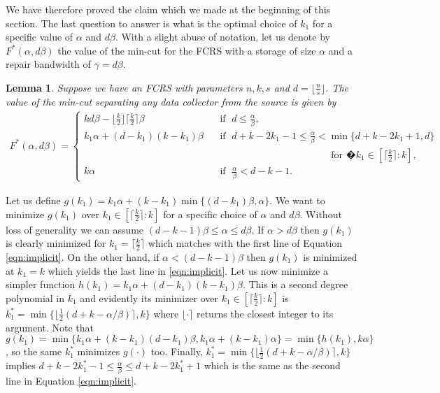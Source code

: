 \documentclass[journal,onecolumn,draftcls]{IEEEtran}
\newtheorem{lemma}{Lemma}
\begin{document}
We have therefore proved the claim which we made at the beginning of this section. The last question to answer is what is the optimal choice of $k_1$ for a specific value of $\alpha$ and $d\beta$. With a slight abuse of notation, let us denote by $F^*(\alpha,d\beta)$ the value of the min-cut for the FCRS with a storage of size $\alpha$ and a repair bandwidth of $\gamma = d\beta$.
\begin{lemma} Suppose we have an FCRS with parameters $n,k,s$ and $d = \lfloor\frac{n}{s}\rfloor$. The value of the min-cut separating any data collector from the source is given by 
\begin{eqnarray}
F^*(\alpha,d\beta) =
\begin{cases}
kd\beta - \lfloor\frac{k}{2}\rfloor\lceil\frac{k}{2}\rceil\beta &\;\;\mbox{ if } \;d\le \frac{\alpha}{\beta},\\
 k_1\alpha + (d-k_1)(k-k_1)\beta&\;\;\mbox{ if } \;d + k - 2k_1 - 1 \le \frac{\alpha}{\beta}<  \min\{d + k - 2k_1 +1,d\} \; \\& \hspace{5cm}\mbox{ for }�k_1 \in[\lceil\frac{k}{2}\rceil : k],\\
 k\alpha &\;\;\mbox{ if } \;\frac{\alpha}{\beta} < d- k - 1.
\end{cases}
\label{eqn:implicit}
\end{eqnarray}
\label{lemma:optimal}
\end{lemma}
\begin{IEEEproof}
Let us define $g(k_1) = k_1\alpha + (k-k_1)\min\{(d-k_1)\beta,\alpha\}$. We want to minimize $g(k_1)$ over $k_1 \in [\lceil\frac{k}{2}\rceil:k ]$ for a specific choice of $\alpha$ and $d\beta$. Without loss of generality we can assume $ (d-k-1)\beta \le \alpha\le d\beta$. If $\alpha >d\beta$ then $g(k_1)$  is clearly minimized  for $k_1 = \lceil \frac{k}{2}\rceil$ which matches with the first line of Equation \eqref{eqn:implicit}. On the other hand, if $\alpha < (d-k-1)\beta $ then $g(k_1)$ is minimized at $k_1 =k$ which yields the last line in \eqref{eqn:implicit}. Let us now minimize a simpler function $h(k_1) = k_1\alpha + (d-k_1)(k-k_1)\beta$. This is a second degree polynomial in $k_1$ and evidently its minimizer over $k_1 \in [\lceil\frac{k}{2}\rceil:k ]$ is $k_1^* = \min\{\lfloor \frac{1}{2}({d+k-\alpha/\beta}) \rceil, k \}$ where $\lfloor\cdot\rceil$ returns the closest integer to its argument. Note that $g(k_1) = \min\{k_1\alpha + (k-k_1)(d-k_1)\beta, k_1\alpha + (k-k_1)\alpha\} =\min\{h(k_1), k\alpha\}  $, so the same $k_1^*$ minimizes $g(\cdot)$ too. Finally, $k_1^* = \min\{\lfloor \frac{1}{2}({d+k-\alpha/\beta}) \rceil, k \}$ implies $d + k - 2k_1^* - 1 \le \frac{\alpha}{\beta}\le d + k - 2k_1^* +1$ which is the same as the second line in Equation \eqref{eqn:implicit}.
\end{IEEEproof}
\end{document}
